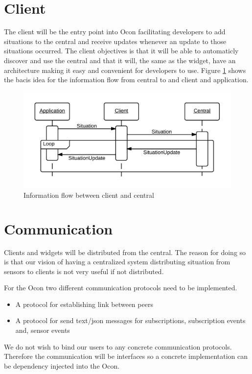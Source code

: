 \documentclass[../report.tex]{subfiles}
\begin{document}
\section{Client}

The client will be the entry point into Ocon facilitating developers to add situations to the central and receive updates whenever an update to those situations occurred. The client objectives is that it will be able to automaticly discover and use the central and that it will, the same as the widget, have an architecture making it easy and convenient for developers to use. Figure \ref{seqclient} shows the bacis idea for the information flow from central to and client and application.


\begin{figure}[h]
\centering
\includegraphics[width=\linewidth]{clientsequencediagram.png}
\caption{Information flow between client and central}
\label{seqclient}
\end{figure}


\section{Communication}

Clients and widgets will be distributed from the central. The reason for doing so is that our vision of having a centralized system distributing situation from sensors to clients is not very useful if not distributed.

For the Ocon two different communication protocols need to be implemented.\\

\begin{itemize}
    \item A protocol for establishing link between peers
    \item A protocol for send text/json messages for subscriptions, subscription events and, sensor events \\
\end{itemize}

We do not wish to bind our users to any concrete communication protocols. Therefore the communication will be interfaces so a concrete implementation can be dependency injected into the Ocon.
\end{document}
